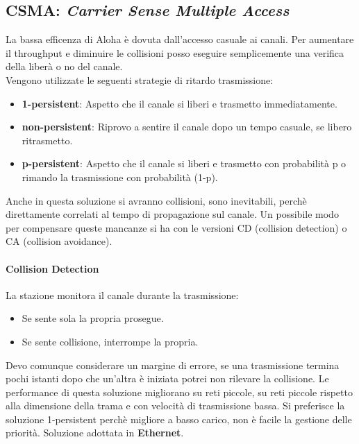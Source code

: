 \documentclass[12pt]{article}
\begin{document}
\subsection{CSMA: \textit{Carrier Sense Multiple Access}}
La bassa efficenza di Aloha è dovuta dall'accesso casuale ai canali. Per aumentare il throughput e diminuire le collisioni posso eseguire semplicemente una verifica della liberà o no del canale.\\
Vengono utilizzate le seguenti strategie di ritardo trasmissione:
\begin{itemize}
  \item \textbf{1-persistent}: Aspetto che il canale si liberi e trasmetto immediatamente.
  \item \textbf{non-persistent}: Riprovo a sentire il canale dopo un tempo casuale, se libero ritrasmetto.
  \item \textbf{p-persistent}: Aspetto che il canale si liberi e trasmetto con probabilità p o rimando la trasmissione con probabilità (1-p).
\end{itemize}
Anche in questa soluzione si avranno collisioni, sono inevitabili, perchè direttamente correlati al tempo di propagazione sul canale. Un possibile modo per compensare queste mancanze si ha con le versioni CD (collision detection) o CA (collision avoidance).
\paragraph{Collision Detection}
La stazione monitora il canale durante la trasmissione:
\begin{itemize}
  \item Se sente sola la propria prosegue.
  \item Se sente collisione, interrompe la propria.
\end{itemize}
Devo comunque considerare un margine di errore, se una trasmissione termina pochi istanti dopo che un'altra è iniziata potrei non rilevare la collisione. Le performance di questa soluzione migliorano su reti piccole, su reti piccole rispetto alla dimensione della trama e con velocità di trasmissione bassa. Si preferisce la soluzione 1-persistent perchè migliore a basso carico, non è facile la gestione delle priorità. Soluzione adottata in \textbf{Ethernet}.
\end{document}
